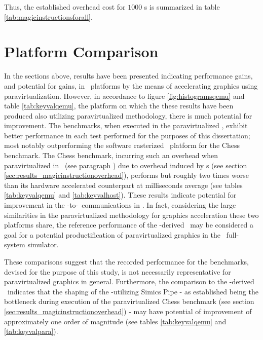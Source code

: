 Thus, the established overhead cost for $1000$ \dvttermmagicinstruction s is summarized in table \ref{tab:magicinstructionsforall}.

\section{Platform Comparison}
\label{sec:analysisexperiment_platformcomparison}
In the sections above, results have been presented indicating performance gains, and potential for gains, in \dvttermsimics\ platforms by the means of accelerating graphics using paravirtualization.
However, in accordance to figure \ref{fig:histogramsqemu} and table \ref{tab:keyvalqemu}, the platform on which the these results have been produced also utilizing paravirtualized methodology, there is much potential for improvement.
The benchmarks, when executed in the paravirtualized \dvttermandroidemulator , exhibit better performance in each test performed for the purposes of this dissertation; most notably outperforming the software rasterized \dvttermsimics\ platform for the Chess benchmark.
The Chess benchmark, incurring such an overhead when paravirtualized in \dvttermsimics\ (see paragraph ) due to overhead induced by \dvttermmagicinstruction s (see section \ref{sec:results_magicinstructionoverhead}), performs but roughly two times worse than its hardware accelerated counterpart at  milliseconds average (see tables \ref{tab:keyvalqemu} and \ref{tab:keyvalhost}).
These results indicate potential for improvement in the \dvttermtarget -to-\dvttermhost\ communications in \dvttermsimics .
In fact, considering the large similarities in the paravirtualized methodology for graphics acceleration these two platforms share, the reference performance of the \dvttermqemu -derived \dvttermandroidemulator\ may be considered a goal for a potential productification of paravirtualized graphics in the \dvttermsimics\ full-system simulator.

These comparisons suggest that the recorded performance for the benchmarks, devised for the purpose of this study, is not necessarily representative for paravirtualized graphics in general.
Furthermore, the comparison to the \dvttermqemu -derived \dvttermandroidemulator\ indicates that the shaping of the \dvttermmagicinstruction -utilizing Simics Pipe - as established being the bottleneck during execution of the paravirtualized Chess benchmark (see section \ref{sec:results_magicinstructionoverhead}) - may have potential of improvement of approximately one order of magnitude (see tables \ref{tab:keyvalqemu} and \ref{tab:keyvalpara}).
